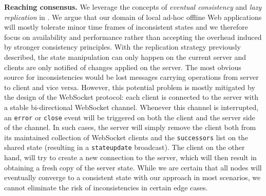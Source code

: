 \textbf{Reaching consensus.}
We leverage the concepts of \textit{eventual consistency} and \textit{lazy replication} in \APIshort.
We argue that our domain of local ad-hoc offline Web applications will mostly tolerate minor time frames of inconsistent states and we therefore focus on availability and performance rather than accepting the overhead induced by stronger consistency principles.
With the replication strategy previously described, the state manipulation can only happen on the current server and clients are only notified of changes applied on the server.
The most obvious source for inconsistencies would be lost messages carrying operations from server to client and vice versa.
However, this potential problem is mostly mitigated by the design of the WebSocket protocol: each client is connected to the server with a stable bi-directional WebSocket channel. 
Whenever this channel is interrupted, an \texttt{error} or \texttt{close} event will be triggered on both the client and the server side of the channel.
In such cases, the server will simply remove the client both from its maintained collection of WebSocket clients and the \texttt{successors} list on the shared state (resulting in a \texttt{stateupdate} broadcast). 
The client on the other hand, will try to create a new connection to the server, which will then result in obtaining a fresh copy of the server state.
While we are certain that all nodes will eventually converge to a consistent state with our approach in most scenarios, we cannot eliminate the risk of inconsistencies in certain edge cases.




